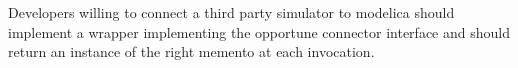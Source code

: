 \documentclass{kapproc} %
\begin{document}
Developers willing to connect a third party simulator to modelica should implement a wrapper implementing the opportune connector interface and should return an instance of the right memento at each invocation.








%

\end{document}
